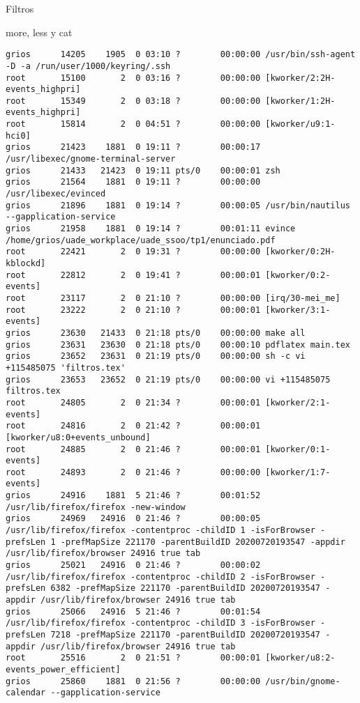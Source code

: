 \begin{section}{Filtros}
\begin{subsection}{more, less y cat}
\begin{lstlisting}[style=Ubuntu]
grios      14205    1905  0 03:10 ?        00:00:00 /usr/bin/ssh-agent -D -a /run/user/1000/keyring/.ssh
root       15100       2  0 03:16 ?        00:00:00 [kworker/2:2H-events_highpri]
root       15349       2  0 03:18 ?        00:00:00 [kworker/1:2H-events_highpri]
root       15814       2  0 04:51 ?        00:00:00 [kworker/u9:1-hci0]
grios      21423    1881  0 19:11 ?        00:00:17 /usr/libexec/gnome-terminal-server
grios      21433   21423  0 19:11 pts/0    00:00:01 zsh
grios      21564    1881  0 19:11 ?        00:00:00 /usr/libexec/evinced
grios      21896    1881  0 19:14 ?        00:00:05 /usr/bin/nautilus --gapplication-service
grios      21958    1881  0 19:14 ?        00:01:11 evince /home/grios/uade_workplace/uade_ssoo/tp1/enunciado.pdf
root       22421       2  0 19:31 ?        00:00:00 [kworker/0:2H-kblockd]
root       22812       2  0 19:41 ?        00:00:01 [kworker/0:2-events]
root       23117       2  0 21:10 ?        00:00:00 [irq/30-mei_me]
root       23222       2  0 21:10 ?        00:00:01 [kworker/3:1-events]
grios      23630   21433  0 21:18 pts/0    00:00:00 make all
grios      23631   23630  0 21:18 pts/0    00:00:10 pdflatex main.tex
grios      23652   23631  0 21:19 pts/0    00:00:00 sh -c vi +115485075 'filtros.tex'
grios      23653   23652  0 21:19 pts/0    00:00:00 vi +115485075 filtros.tex
root       24805       2  0 21:34 ?        00:00:01 [kworker/2:1-events]
root       24816       2  0 21:42 ?        00:00:01 [kworker/u8:0+events_unbound]
root       24885       2  0 21:46 ?        00:00:01 [kworker/0:1-events]
root       24893       2  0 21:46 ?        00:00:00 [kworker/1:7-events]
grios      24916    1881  5 21:46 ?        00:01:52 /usr/lib/firefox/firefox -new-window
grios      24969   24916  0 21:46 ?        00:00:05 /usr/lib/firefox/firefox -contentproc -childID 1 -isForBrowser -prefsLen 1 -prefMapSize 221170 -parentBuildID 20200720193547 -appdir /usr/lib/firefox/browser 24916 true tab
grios      25021   24916  0 21:46 ?        00:00:02 /usr/lib/firefox/firefox -contentproc -childID 2 -isForBrowser -prefsLen 6382 -prefMapSize 221170 -parentBuildID 20200720193547 -appdir /usr/lib/firefox/browser 24916 true tab
grios      25066   24916  5 21:46 ?        00:01:54 /usr/lib/firefox/firefox -contentproc -childID 3 -isForBrowser -prefsLen 7218 -prefMapSize 221170 -parentBuildID 20200720193547 -appdir /usr/lib/firefox/browser 24916 true tab
root       25516       2  0 21:51 ?        00:00:01 [kworker/u8:2-events_power_efficient]
grios      25860    1881  0 21:56 ?        00:00:00 /usr/bin/gnome-calendar --gapplication-service

\end{lstlisting}
\end{subsection}
\end{section}
